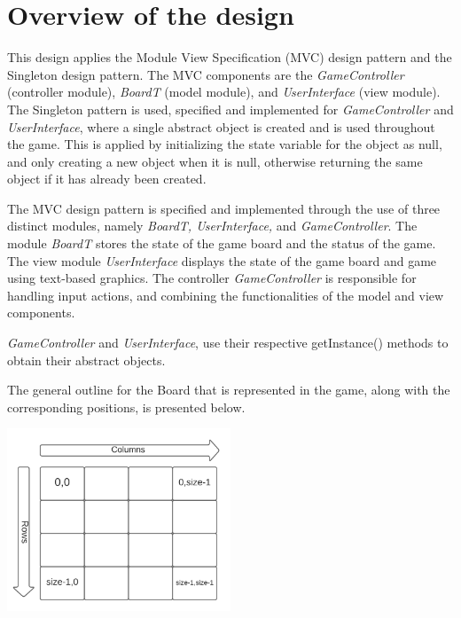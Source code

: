 \documentclass[12pt]{article}
\begin{document}
\newpage

\section{Overview of the design}

This design applies the Module View Specification (MVC) design pattern and the Singleton design pattern. The MVC components
are the \textit{GameController} (controller module), \textit{BoardT} (model module), and \textit{UserInterface} (view module).\\

The Singleton pattern is used, specified and implemented for \textit{GameController} and \textit{UserInterface}, where a single abstract object is created and is used throughout the game. This is applied by initializing the state variable for the object as null, and only creating a new object when it is null, otherwise returning the same object if it has already been created.

\medskip
The MVC design pattern is specified and implemented through the use of three distinct modules, namely \textit{BoardT, UserInterface,} and \textit{GameController}. The module \textit{BoardT} stores the state of the game board and the status of the game. The view module \textit{UserInterface} displays the state of the game board and game using text-based graphics. The controller \textit{GameController} is responsible for handling input actions, and combining the functionalities of the model and view components.

\medskip

\textit{GameController} and \textit{UserInterface}, use their respective getInstance() methods to obtain their abstract objects.\\

\newpage

The general outline for the Board that is represented in the game, along with the corresponding positions, is presented below.

\begin{center}
    \includegraphics[width=0.5\textwidth]{Board_Diagram.png} \\
\end{center}
\end{document}
